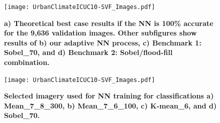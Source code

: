 \documentclass[final,3p,times,authoryear]{elsarticle}
\begin{document}
\begin{figure}
\centering
\texttt{[image: UrbanClimateICUC10-SVF\_Images.pdf]} 
\caption{\textbf{a) Theoretical best case results if the NN is 100\% accurate for the 9,636 validation images. Other subfigures show results of b) our adaptive NN process, c) Benchmark 1: Sobel\_70, and d) Benchmark 2: Sobel/flood-fill combination.}}
\label{fig:errorfloodall}
\end{figure}






\begin{figure}
\centering
\texttt{[image: UrbanClimateICUC10-SVF\_Images.pdf]} 
\caption{\textbf{Selected imagery used for NN training for classifications 
a) Mean\_7\_8\_300, b) Mean\_7\_6\_100, c) K-mean\_6, and d) Sobel\_70.}}
\label{fig:classImages}
\end{figure}
\end{document}
